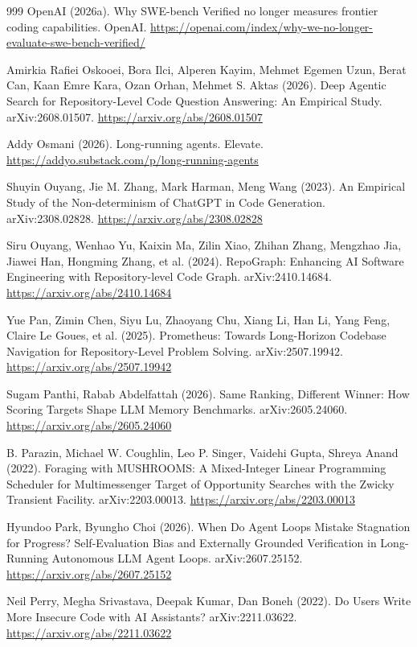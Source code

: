 \begin{thebibliography}{999}
 OpenAI (2026a). Why SWE-bench Verified no longer measures frontier coding capabilities. OpenAI. \url{https://openai.com/index/why-we-no-longer-evaluate-swe-bench-verified/}

 Amirkia Rafiei Oskooei, Bora Ilci, Alperen Kayim, Mehmet Egemen Uzun, Berat Can, Kaan Emre Kara, Ozan Orhan, Mehmet S. Aktas (2026). Deep Agentic Search for Repository-Level Code Question Answering: An Empirical Study. arXiv:2608.01507. \url{https://arxiv.org/abs/2608.01507}

 Addy Osmani (2026). Long-running agents. Elevate. \url{https://addyo.substack.com/p/long-running-agents}

 Shuyin Ouyang, Jie M. Zhang, Mark Harman, Meng Wang (2023). An Empirical Study of the Non-determinism of ChatGPT in Code Generation. arXiv:2308.02828. \url{https://arxiv.org/abs/2308.02828}

 Siru Ouyang, Wenhao Yu, Kaixin Ma, Zilin Xiao, Zhihan Zhang, Mengzhao Jia, Jiawei Han, Hongming Zhang, et al. (2024). RepoGraph: Enhancing AI Software Engineering with Repository-level Code Graph. arXiv:2410.14684. \url{https://arxiv.org/abs/2410.14684}

 Yue Pan, Zimin Chen, Siyu Lu, Zhaoyang Chu, Xiang Li, Han Li, Yang Feng, Claire Le Goues, et al. (2025). Prometheus: Towards Long-Horizon Codebase Navigation for Repository-Level Problem Solving. arXiv:2507.19942. \url{https://arxiv.org/abs/2507.19942}

 Sugam Panthi, Rabab Abdelfattah (2026). Same Ranking, Different Winner: How Scoring Targets Shape LLM Memory Benchmarks. arXiv:2605.24060. \url{https://arxiv.org/abs/2605.24060}

 B. Parazin, Michael W. Coughlin, Leo P. Singer, Vaidehi Gupta, Shreya Anand (2022). Foraging with MUSHROOMS: A Mixed-Integer Linear Programming Scheduler for Multimessenger Target of Opportunity Searches with the Zwicky Transient Facility. arXiv:2203.00013. \url{https://arxiv.org/abs/2203.00013}

 Hyundoo Park, Byungho Choi (2026). When Do Agent Loops Mistake Stagnation for Progress? Self-Evaluation Bias and Externally Grounded Verification in Long-Running Autonomous LLM Agent Loops. arXiv:2607.25152. \url{https://arxiv.org/abs/2607.25152}

 Neil Perry, Megha Srivastava, Deepak Kumar, Dan Boneh (2022). Do Users Write More Insecure Code with AI Assistants? arXiv:2211.03622. \url{https://arxiv.org/abs/2211.03622}


\end{thebibliography}
